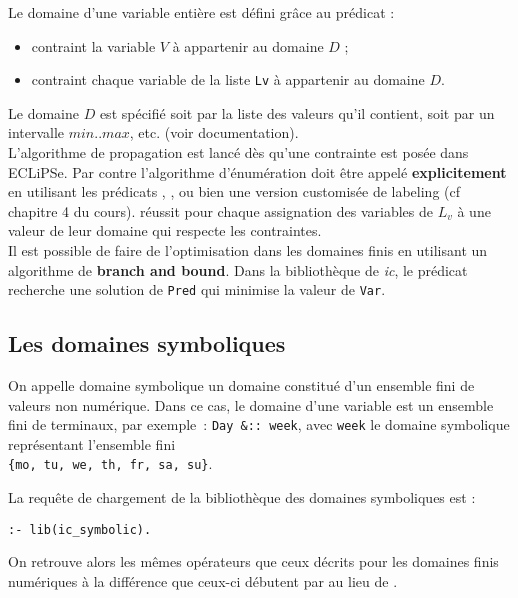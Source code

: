 Le domaine d'une variable entière est défini grâce au prédicat  :

\begin{itemize}
\item {} contraint la variable $V$ à appartenir au domaine $D$ ;
\item {} contraint chaque variable de la liste \verb|Lv|
  à appartenir au domaine $D$.
\end{itemize}

Le domaine $D$ est spécifié soit par la liste des valeurs qu'il contient, soit
par un intervalle $\mathit{min}..\mathit{max}$, etc. (voir documentation).\\

L'algorithme de propagation est lancé dès qu'une contrainte est posée
dans ECLiPSe. Par contre l'algorithme d'énumération doit être appelé
\textbf{explicitement} en utilisant les prédicats ,
, ou bien une version customisée de labeling (cf
chapitre 4 du cours).
%
 réussit pour chaque assignation des variables de
$L_v$ à une valeur de leur domaine qui respecte les contraintes.\\

Il est possible de faire de l'optimisation dans les domaines finis en utilisant
un algorithme de \textbf{branch and bound}. Dans la bibliothèque
 de \emph{ic}, le prédicat  recherche une solution de
\verb|Pred| qui minimise la valeur de \verb|Var|.

\subsection*{Les domaines symboliques}

On appelle domaine symbolique un domaine constitué d'un ensemble fini
de valeurs non numérique.  Dans ce cas, le domaine d'une variable est
un ensemble fini de terminaux, par exemple~: \verb|Day &:: week|, avec
\verb|week| le domaine symbolique représentant l'ensemble fini \\
\verb|{mo, tu, we, th, fr, sa, su}|.

La requête de chargement de la bibliothèque des domaines symboliques est :
\begin{verbatim}
:- lib(ic_symbolic).
\end{verbatim}

On retrouve alors les mêmes opérateurs que ceux décrits pour les
domaines finis numériques à la différence que ceux-ci débutent par
\code{\&} au lieu de \code{\#}.

